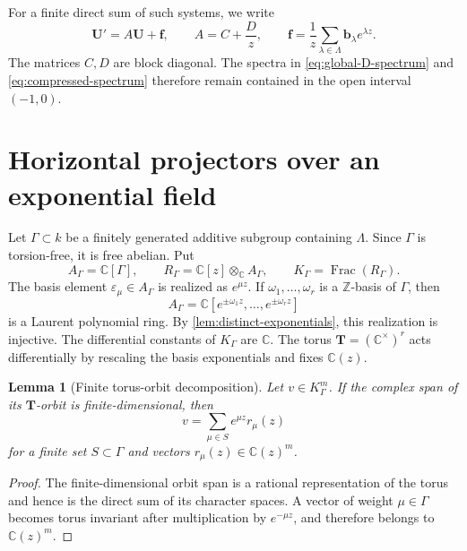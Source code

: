 \documentclass[11pt]{article}
\numberwithin{equation}{section}
\newtheorem{lemma}[lemma]{Lemma}
\theoremstyle{definition}
\theoremstyle{remark}
\newcommand{\C}{\mathbb C}
\newcommand{\Frac}{\operatorname{Frac}}
\begin{document}
For a finite direct sum of such systems, we write
\begin{equation}\label{eq:direct-system}
  \mathbf U'=A\mathbf U+\mathbf f,
  \qquad
  A=C+\frac Dz,
  \qquad
  \mathbf f=\frac1z\sum_{\lambda\in\Lambda}
      \mathbf b_\lambda e^{\lambda z}.
\end{equation}
The matrices $C,D$ are block diagonal.  The spectra in
\eqref{eq:global-D-spectrum} and \eqref{eq:compressed-spectrum} therefore
remain contained in the open interval $(-1,0)$.

\section{Horizontal projectors over an exponential field}
\label{sec:projectors}

Let $\Gamma\subset k$ be a finitely generated additive subgroup containing
$\Lambda$.  Since $\Gamma$ is torsion-free, it is free abelian.  Put
\begin{equation}\label{eq:exponential-rings}
  A_\Gamma=\C[\Gamma],
  \qquad
  R_\Gamma=\C[z]\otimes_\C A_\Gamma,
  \qquad
  K_\Gamma=\Frac(R_\Gamma).
\end{equation}
The basis element $\varepsilon_\mu\in A_\Gamma$ is realized as
$e^{\mu z}$.  If $\omega_1,\ldots,\omega_r$ is a $\mathbb Z$-basis of
$\Gamma$, then
\[
  A_\Gamma=\C[e^{\pm\omega_1z},\ldots,e^{\pm\omega_rz}]
\]
is a Laurent polynomial ring.  By \cref{lem:distinct-exponentials}, this
realization is injective.  The differential constants of $K_\Gamma$ are
$\C$.  The torus $\mathbf T=(\C^\times)^r$ acts differentially by rescaling
the basis exponentials and fixes $\C(z)$.

\begin{lemma}[Finite torus-orbit decomposition]
\label{lem:finite-orbit}
Let $v\in K_\Gamma^m$.  If the complex span of its $\mathbf T$-orbit is
finite-dimensional, then
\[
  v=\sum_{\mu\in S}e^{\mu z}r_\mu(z)
\]
for a finite set $S\subset\Gamma$ and vectors
$r_\mu(z)\in\C(z)^m$.
\end{lemma}

\begin{proof}
The finite-dimensional orbit span is a rational representation of the torus
and hence is the direct sum of its character spaces.  A vector of weight
$\mu\in\Gamma$ becomes torus invariant after multiplication by
$e^{-\mu z}$, and therefore belongs to $\C(z)^m$.
\end{proof}
\end{document}
